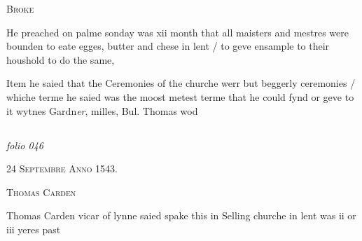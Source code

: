 \documentclass[12pt, a4paper]{book}
\begin{document}
               
                  
				\begin{center}  {\scshape Broke}  \end{center}
			
               	
				\marginpar[\vspace{0.5cm}{\textcolor{Gray}{lent}}]{}
			
		\ifthenelse{\isodd{\thepage}}
		{\reversemarginpar}
		{\normalmarginpar}
		He preached on palme sonday was xii month that
 all maisters and mestres were bounden to eate
 egges, butter and chese in lent / to geve ensample
 to their houshold to do the same,
               	
				\marginpar[\vspace{0.5cm}{\textcolor{Gray}{ceremonies}}]{}
			
               		
				\marginpar[\vspace{0.5cm}{\textcolor{Gray}{+}}]{}
			
               		
		\ifthenelse{\isodd{\thepage}}
		{\reversemarginpar}
		{\normalmarginpar}
		Item he saied that the Ceremonies of the churche
 werr but beggerly ceremonies / whiche terme
 he saied was the moost metest terme that he
 could fynd or geve to it wytnes Gardn\textit{er},
               			milles, Bul. Thomas wod


            
            
\dotfill
						\newpage {} \subsection*{}

\textit{folio 046}


            
               
				\begin{center} \begin{large} {\scshape 
                  24 Septembre Anno 1543.} \end{large} \end{center}
			
               
               	
				\begin{center}  {\scshape Thomas Carden}  \end{center}
			
               	
		\ifthenelse{\isodd{\thepage}}
		{\reversemarginpar}
		{\normalmarginpar}
		Thomas Carden vicar of lynne saied spake this
 in Selling churche in lent was ii or iii yeres past
 
\end{document}
